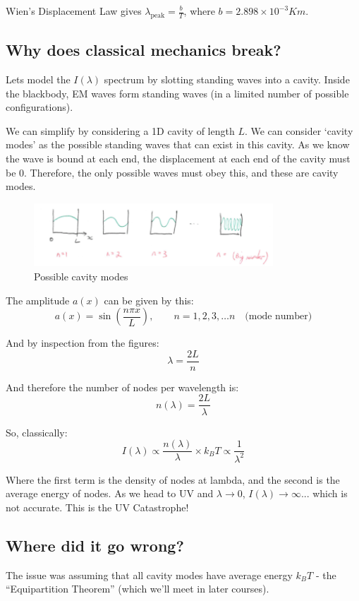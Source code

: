 Wien's Displacement Law gives $\lambda_{\text{peak}} = \frac{b}{T}$, where $b = 2.898 \times 10^{-3} Km$.

\subsection*{Why does classical mechanics break?}

Lets model the $I(\lambda)$ spectrum by slotting standing waves into a cavity. Inside the blackbody, EM waves form standing waves (in a limited number of possible configurations).

We can simplify by considering a 1D cavity of length $L$. We can consider `cavity modes' as the possible standing waves that can exist in this cavity. As we know the wave is bound at each end, the displacement at each end of the cavity must be $0$. Therefore, the only possible waves must obey this, and these are cavity modes.

\begin{figure}[H]
    \centering
    \includegraphics[width=0.8\textwidth]{figures/lec02-03.png}
     \caption{Possible cavity modes}
\end{figure}

The amplitude $a(x)$ can be given by this:
\[
    a(x) = \sin \left(\frac{n \pi x}{L}\right), \qquad n = 1, 2, 3, \ldots n \quad \text{(mode number)}
\]

And by inspection from the figures:
\[
    \lambda = \frac{2L}{n}
\]

And therefore the number of nodes per wavelength is:
\[
    n(\lambda) = \frac{2L}{\lambda}
\]

So, classically:
\[
    I(\lambda) \propto \frac{n(\lambda)}{\lambda} \times k_B T \propto \frac{1}{\lambda^2}
\]

Where the first term is the density of nodes at lambda, and the second is the average energy of nodes. As we head to UV and $\lambda \to 0$, $I(\lambda) \to \infty$... which is not accurate. This is the UV Catastrophe!


\subsection*{Where did it go wrong?}
The issue was assuming that all cavity modes have average energy $k_B T$ - the ``Equipartition Theorem'' (which we'll meet in later courses).

